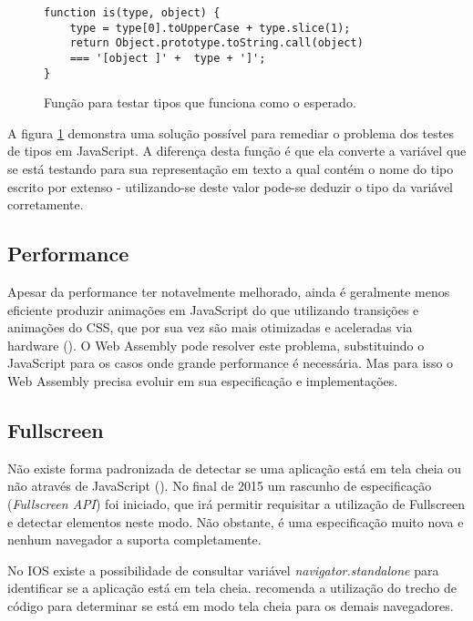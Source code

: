 \begin{figure}[H]
\centering
\begin{verbatim}
function is(type, object) {
    type = type[0].toUpperCase + type.slice(1);
    return Object.prototype.toString.call(object)
    === '[object ]' +  type + ']';
}
\end{verbatim}
\caption{Função para testar tipos que funciona como o esperado.}
\label{fig:fixJSTypes}
\end{figure}

A figura \ref{fig:fixJSTypes} demonstra uma solução possível para
remediar o problema dos testes de tipos em JavaScript. A diferença
desta função é que ela converte a variável que se está testando
para sua representação em texto a qual contém o nome do tipo escrito
por extenso - utilizando-se deste valor pode-se deduzir o tipo da
variável corretamente.

\subsection{Performance}

Apesar da performance ter notavelmente melhorado, ainda é geralmente
menos eficiente produzir animações em JavaScript do que utilizando
transições e animações do CSS, que por sua vez são mais
otimizadas e aceleradas via hardware \autocite{html5mostwanted}
(). O Web Assembly pode resolver este problema,
substituindo o JavaScript para os casos onde grande performance é
necessária. Mas para isso o Web Assembly precisa evoluir em sua
especificação e implementações.

\subsection{Fullscreen}

Não existe forma padronizada de detectar se uma aplicação
está em tela cheia ou não através de JavaScript
(). No final de 2015 um rascunho de 
especificação (\textit{Fullscreen API}) foi iniciado, que irá permitir 
requisitar a utilização de Fullscreen e detectar elementos neste modo.
Não obstante, é uma especificação muito nova e nenhum navegador a suporta
completamente.

No IOS existe a possibilidade de consultar variável
\textit{navigator.standalone } para identificar se a aplicação está
em tela cheia. \citet{homescreenwebapps} recomenda a utilização do
trecho de código para determinar se está em modo tela cheia para os
demais navegadores.

